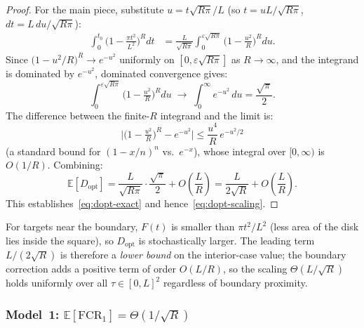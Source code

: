\begin{proof}
For the main piece, substitute $u = t\sqrt{R\pi}/L$ (so $t = uL/\sqrt{R\pi}$,
$dt = L\,du/\sqrt{R\pi}$):
\begin{align}
  \int_0^{t_0}\!\!\bigl(1-\tfrac{\pi t^2}{L^2}\bigr)^R dt
  &= \frac{L}{\sqrt{R\pi}}
     \int_0^{\varepsilon\sqrt{R\pi}}
     \bigl(1 - \tfrac{u^2}{R}\bigr)^R du.
  \label{eq:gaussian-approx}
\end{align}
Since $\bigl(1 - u^2/R\bigr)^R \to e^{-u^2}$ uniformly on $[0,\varepsilon\sqrt{R\pi}]$
as $R\to\infty$, and the integrand is dominated by $e^{-u^2}$, dominated
convergence gives:
\begin{equation}
  \int_0^{\varepsilon\sqrt{R\pi}}\!\!\bigl(1-\tfrac{u^2}{R}\bigr)^R du
  \;\longrightarrow\;
  \int_0^\infty e^{-u^2}\,du = \frac{\sqrt{\pi}}{2}.
\end{equation}
The difference between the finite-$R$ integrand and the limit is:
\[
  \bigl|\bigl(1-\tfrac{u^2}{R}\bigr)^R - e^{-u^2}\bigr|
  \leq \frac{u^4}{R}\,e^{-u^2/2}
\]
(a standard bound for $(1-x/n)^n$ vs.\ $e^{-x}$), whose integral over
$[0,\infty)$ is $O(1/R)$.
Combining:
\[
  \mathbb{E}[D_{\mathrm{opt}}]
  = \frac{L}{\sqrt{R\pi}} \cdot \frac{\sqrt{\pi}}{2} + O\!\left(\frac{L}{R}\right)
  = \frac{L}{2\sqrt{R}} + O\!\left(\frac{L}{R}\right).
\]
This establishes~\eqref{eq:dopt-exact} and hence~\eqref{eq:dopt-scaling}.
\end{proof}

\begin{remark}\label{rem:dopt-boundary}
For targets near the boundary, $F(t)$ is smaller than $\pi t^2/L^2$
(less area of the disk lies inside the square), so $D_{\mathrm{opt}}$
is stochastically larger.
The leading term $L/(2\sqrt{R})$ is therefore a \emph{lower bound} on
the interior-case value; the boundary correction adds a positive term
of order $O(L/R)$, so the scaling $\Theta(L/\sqrt{R})$ holds uniformly
over all $\tau \in [0,L]^2$ regardless of boundary proximity.
\end{remark}

\subsubsection{Model~1: \texorpdfstring{$\mathbb{E}[\mathrm{FCR}_1] = \Theta(1/\sqrt{R})$}{E[FCR1] = Theta(1/sqrt(R))}}

